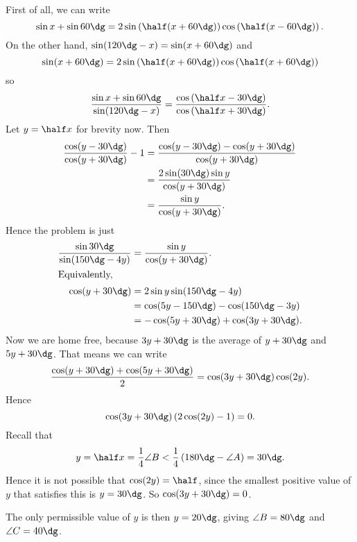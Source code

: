 First of all, we can write
\[ \sin x + \sin 60\dg
  = 2\sin \left( \half (x+60\dg) \right)
  \cos \left( \half (x-60\dg) \right). \]
On the other hand, $\sin (120\dg - x) = \sin(x+60\dg)$ and
\[ \sin (x+60\dg)
  = 2 \sin \left( \half (x+60\dg) \right)
  \cos \left( \half(x+60\dg) \right) \]
so
\[ \frac{\sin x + \sin 60\dg}{\sin (120\dg - x)}
  = \frac{\cos \left( \half x - 30\dg \right)}%
  {\cos \left( \half x + 30\dg \right)}. \]
Let $y = \half x$ for brevity now. Then
\begin{align*}
  \frac{\cos(y-30\dg)}{\cos(y+30\dg)} - 1
  &= \frac{\cos(y-30\dg)-\cos(y+30\dg)}{\cos(y+30\dg)} \\
  &= \frac{2 \sin (30\dg) \sin y}{\cos(y+30\dg)} \\
  &= \frac{\sin y}{\cos (y+30\dg)}.
\end{align*}
Hence the problem is just
\begin{align*}
  \frac{\sin 30\dg}{\sin(150\dg - 4y)} &= \frac{\sin y}{\cos(y+30\dg)}. \\
  \intertext{Equivalently,}
  \cos(y+30\dg) &= 2\sin y \sin (150\dg -4y) \\
  &= \cos(5y-150\dg) - \cos(150\dg-3y) \\
  &= -\cos(5y+30\dg) + \cos(3y+30\dg).
\end{align*}
Now we are home free, because $3y+30\dg$
is the average of $y+30\dg$ and $5y+30\dg$.
That means we can write
\[ \frac{\cos(y+30\dg)+\cos(5y+30\dg)}{2} = \cos(3y+30\dg) \cos(2y). \]
Hence
\[ \cos(3y+30\dg) \left( 2\cos(2y)-1 \right) = 0. \]
Recall that
\[ y = \half x = \frac 14 \angle B
  < \frac 14 \left( 180\dg - \angle A \right) = 30\dg. \]
Hence it is not possible that $\cos(2y) = \half$,
since the smallest positive value of $y$
that satisfies this is $y=30\dg$.
So $\cos (3y+30\dg) = 0$.

The only permissible value of $y$ is then $y = 20\dg$,
giving $\angle B = 80\dg$ and $\angle C = 40\dg$.
\pagebreak